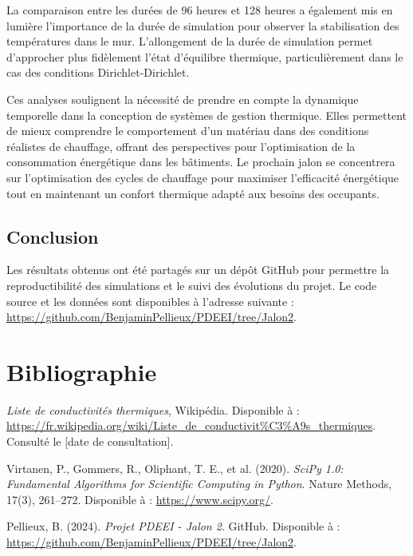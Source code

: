 \documentclass[a4paper,11pt]{article}
\begin{document}
La comparaison entre les durées de 96 heures et 128 heures a également mis en lumière l'importance de la durée de simulation pour observer la stabilisation des températures dans le mur. L'allongement de la durée de simulation permet d'approcher plus fidèlement l'état d'équilibre thermique, particulièrement dans le cas des conditions Dirichlet-Dirichlet.

Ces analyses soulignent la nécessité de prendre en compte la dynamique temporelle dans la conception de systèmes de gestion thermique. Elles permettent de mieux comprendre le comportement d'un matériau dans des conditions réalistes de chauffage, offrant des perspectives pour l'optimisation de la consommation énergétique dans les bâtiments. Le prochain jalon se concentrera sur l'optimisation des cycles de chauffage pour maximiser l'efficacité énergétique tout en maintenant un confort thermique adapté aux besoins des occupants.

\subsection{Conclusion}
Les résultats obtenus ont été partagés sur un dépôt GitHub pour permettre la reproductibilité des simulations et le suivi des évolutions du projet. Le code source et les données sont disponibles à l'adresse suivante : \url{https://github.com/BenjaminPellieux/PDEEI/tree/Jalon2}.


\newpage
\section*{Bibliographie}
\begin{thebibliography}{9}
    \textit{Liste de conductivités thermiques}, Wikipédia. Disponible à : \url{https://fr.wikipedia.org/wiki/Liste_de_conductivit%C3%A9s_thermiques}. Consulté le [date de consultation].
    
    Virtanen, P., Gommers, R., Oliphant, T. E., et al. (2020). \textit{SciPy 1.0: Fundamental Algorithms for Scientific Computing in Python}. Nature Methods, 17(3), 261–272. Disponible à : \url{https://www.scipy.org/}.
    
    Pellieux, B. (2024). \textit{Projet PDEEI - Jalon 2}. GitHub. Disponible à : \url{https://github.com/BenjaminPellieux/PDEEI/tree/Jalon2}.
\end{thebibliography}
\end{document}
